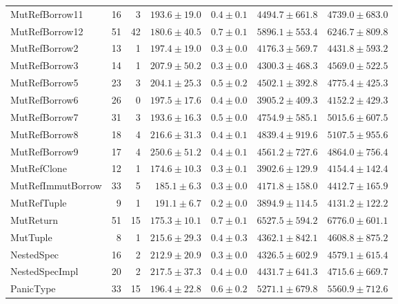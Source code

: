 \begin{table}
\begin{tabular}{lrrrrrr}
MutRefBorrow11           &   16 &    3 &     $193.6\pm19.0$ &  $0.4\pm0.1$ &   $4494.7\pm661.8$ &   $4739.0\pm683.0$ \\
MutRefBorrow12           &   51 &   42 &     $180.6\pm40.5$ &  $0.7\pm0.1$ &   $5896.1\pm553.4$ &   $6246.7\pm809.8$ \\
MutRefBorrow2            &   13 &    1 &     $197.4\pm19.0$ &  $0.3\pm0.0$ &   $4176.3\pm569.7$ &   $4431.8\pm593.2$ \\
MutRefBorrow3            &   14 &    1 &     $207.9\pm50.2$ &  $0.3\pm0.0$ &   $4300.3\pm468.3$ &   $4569.0\pm522.5$ \\
MutRefBorrow5            &   23 &    3 &     $204.1\pm25.3$ &  $0.5\pm0.2$ &   $4502.1\pm392.8$ &   $4775.4\pm425.3$ \\
MutRefBorrow6            &   26 &    0 &     $197.5\pm17.6$ &  $0.4\pm0.0$ &   $3905.2\pm409.3$ &   $4152.2\pm429.3$ \\
MutRefBorrow7            &   31 &    3 &     $193.6\pm16.3$ &  $0.5\pm0.0$ &   $4754.9\pm585.1$ &   $5015.6\pm607.5$ \\
MutRefBorrow8            &   18 &    4 &     $216.6\pm31.3$ &  $0.4\pm0.1$ &   $4839.4\pm919.6$ &   $5107.5\pm955.6$ \\
MutRefBorrow9            &   17 &    4 &     $250.6\pm51.2$ &  $0.4\pm0.1$ &   $4561.2\pm727.6$ &   $4864.0\pm756.4$ \\
MutRefClone              &   12 &    1 &     $174.6\pm10.3$ &  $0.3\pm0.1$ &   $3902.6\pm129.9$ &   $4154.4\pm142.4$ \\
MutRefImmutBorrow        &   33 &    5 &      $185.1\pm6.3$ &  $0.3\pm0.0$ &   $4171.8\pm158.0$ &   $4412.7\pm165.9$ \\
MutRefTuple              &    9 &    1 &      $191.1\pm6.7$ &  $0.2\pm0.0$ &   $3894.9\pm114.5$ &   $4131.2\pm122.2$ \\
MutReturn                &   51 &   15 &     $175.3\pm10.1$ &  $0.7\pm0.1$ &   $6527.5\pm594.2$ &   $6776.0\pm601.1$ \\
MutTuple                 &    8 &    1 &     $215.6\pm29.3$ &  $0.4\pm0.3$ &   $4362.1\pm842.1$ &   $4608.8\pm875.2$ \\
NestedSpec               &   16 &    2 &     $212.9\pm20.9$ &  $0.3\pm0.0$ &   $4326.5\pm602.9$ &   $4579.1\pm615.4$ \\
NestedSpecImpl           &   20 &    2 &     $217.5\pm37.3$ &  $0.4\pm0.0$ &   $4431.7\pm641.3$ &   $4715.6\pm669.7$ \\
PanicType                &   33 &   15 &     $196.4\pm22.8$ &  $0.6\pm0.2$ &   $5271.1\pm679.8$ &   $5560.9\pm712.6$ \\

\end{tabular}
\end{table}
